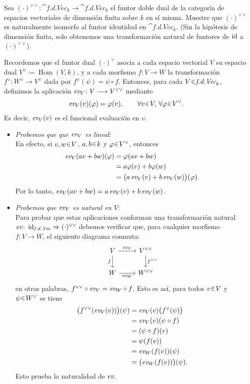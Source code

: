 \begin{nejer}
Sea $(\cdot)^{\vee\vee} \colon \cat{f.d.Vec}_k \to \cat{f.d.Vec}_k$ el funtor doble dual de la categoría de espacios vectoriales de dimensión finita sobre $k$ en sí misma. Muestre que $(\cdot)^{\vee\vee}$ es naturalmente isomorfo al funtor identidad en $\cat{f.d.Vec}_k$. (Sin la hipótesis de dimensión finita, solo obtenemos una transformación natural de funtores de $\operatorname{id}$ a $(\cdot)^{\vee\vee}$).
\end{nejer}
\begin{sol}
Recordemos que el funtor dual $(\cdot)^\vee$ asocia a cada espacio vectorial $V$ su espacio dual $V^\vee \coloneq \operatorname{Hom}(V,k)$, y a cada morfismo $f \colon V \to W$ la transformación $f^\vee \colon W^\vee \to V^\vee$ dada por $f^\vee(\psi) = \psi \circ f$.
Entonces, para cada $V\en\cat{f.d.Vec}_k$, definimos la aplicación $\operatorname{\textit{ev}}_V \colon V \longrightarrow V^{\vee\vee}$ mediante
\[
\ev_V(v)(\varphi)=\varphi(v),
\qquad
\forall v\en V,\, \forall\varphi\en V^\vee.
\]
Es decir, $\operatorname{\textit{ev}}_V(v)$ es el funcional evaluación en $v$.

\begin{itemize}
\item\emph{Probemos que que $\operatorname{\textit{ev}}_V$ es lineal}:\\
En efecto, si
$v,w\en V$, $a,b\en k$ y $\varphi\en V^\vee$, entonces
\[
\begin{aligned}
\operatorname{\textit{ev}}_V(av+bw)(\varphi)
&=\varphi(av+bw)\\
&=a\varphi(v)+b\varphi(w)\\
&=\bigl(a\operatorname{\textit{ev}}_V(v)+b\operatorname{\textit{ev}}_V(w)\bigr)(\varphi).
\end{aligned}
\]
Por lo tanto, $\operatorname{\textit{ev}}_V(av+bw)=a\operatorname{\textit{ev}}_V(v)+b\operatorname{\textit{ev}}_V(w)$.

\item\emph{Probemos que $\operatorname{\textit{ev}}_V$ es natural en $V$}:\\
Para probar que estas aplicaciones conforman una transformación natural $\operatorname{\textit{ev}} \colon \operatorname{id}_{\textit{f.d.Vec}} \Rightarrow (\cdot)^{\vee\vee}$ debemos verificar que, para cualquier morfismo $f\colon V \to W$, el siguiente diagrama conmuta:
\[\begin{tikzcd}
V \arrow[r,"\ev_V"] \arrow[d,"f"'] &
V^{\vee\vee} \arrow[d,"f^{\vee\vee}"]\\
W \arrow[r,"\ev_W"'] &
W^{\vee\vee}
\end{tikzcd}\]
en otras palabras, $f^{\vee\vee}\circ{\operatorname{\textit{ev}}_V}
=
{\operatorname{\textit{ev}}_W}\circ f$. Esto es así, para todos $v\en V$ y $\psi \en W^\vee$ se tiene
\[\begin{aligned}
\bigl(f^{\vee\vee}(\operatorname{\textit{ev}}_V(v))\bigr)(\psi)
&=\operatorname{\textit{ev}}_V(v)\bigl(f^\vee(\psi)\bigr)\\
&=\operatorname{\textit{ev}}_V(v)(\psi\circ f)\\
&=(\psi\circ f)(v)\\
&=\psi(f(v))\\
&=\operatorname{\textit{ev}}_W(f(v))(\psi)\\
&=\bigl(\operatorname{\textit{ev}}_W(f(v))\bigr)(\psi).
\end{aligned}\]
Esto prueba la naturalidad de $\operatorname{\textit{ev}}$.


\end{itemize}
\end{sol}
